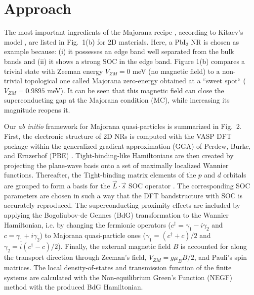 \documentclass[10pt,usletter,conference]{IEEEtran}
\begin{document}
\section{Approach}\label{sec:app}
The most important ingredients of the Majorana recipe
\cite{Lutchyn,Oreg}, according to Kitaev's model \cite{Kitaev}, are
listed in Fig.~1(b) for 2D materials. Here, a PbI$_{2}$ NR is chosen as
example because: (i) it possesses an edge band well separated from the
bulk bands and (ii) it shows a strong SOC in the edge band. Figure
1(b) compares a trivial state with Zeeman energy $V_{ZM}=0$ meV (no
magnetic field) to a non-trivial topological one called Majorana
zero-energy obtained at a ``sweet spot`` ($V_{ZM}=0.9895$ meV). It
can be seen that this magnetic field can close the superconducting gap
at the Majorana condition (MC), while increasing its magnitude reopens
it. 

Our \textit{ab initio} framework for Majorana quasi-particles is
summarized in Fig.~2. First, the electronic structure of 2D NRs is
computed with the VASP DFT package \cite{vasp} within the generalized
gradient approximation (GGA) of Perdew, Burke, and Ernzerhof (PBE)
\cite{gga}. Tight-binding-like Hamiltonians are then created by
projecting the plane-wave basis onto a set of maximally localized
Wannier functions. Thereafter, the Tight-binding matrix elements of the $p$ and
$d$ orbitals are grouped to form a basis for the $\vec{L}\cdot
\vec{s}$ SOC operator \cite{Konschuh}. The corresponding SOC 
parameters are chosen in such a way that the DFT bandstructure with
SOC is accurately reproduced. The superconducting proximity effects
are included by applying the Bogoliubov-de Gennes (BdG) transformation
to the Wannier Hamiltonian, i.e. by changing the fermionic operators
($c^{\dagger}=\gamma_1 - i\gamma_2$ and $c=\gamma_1 + i\gamma_2$) to
Majorana quasi-particle ones ($\gamma_{1} = (c^{\dagger}+c)/2$ and
$\gamma_{2} = i(c^{\dagger}-c)/2$). Finally, the external magnetic
field $B$ is accounted for along the transport direction through
Zeeman's field, $V_{ZM}=g\mu_{B}B/2$, and Pauli's spin matrices. The
local density-of-states and transmission function of the finite
systems are calculated with the Non-equilibrium Green's Function
(NEGF) method with the produced BdG Hamiltonian. 
\end{document}
